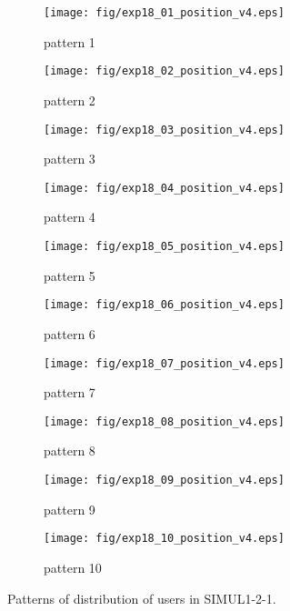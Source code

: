 	\begin{figure}
		\begin{center}
			\begin{subfigure}[b]{0.32\textwidth}
				\texttt{[image: fig/exp18\_01\_position\_v4.eps]}
				\caption{pattern 1}
				\label{figure:simul1_2_1_a}
			\end{subfigure}
			\begin{subfigure}[b]{0.32\textwidth}
				\texttt{[image: fig/exp18\_02\_position\_v4.eps]}
				\caption{pattern 2}
				\label{figure:simul1_2_1_b}
			\end{subfigure}
			\begin{subfigure}[b]{0.32\textwidth}
				\texttt{[image: fig/exp18\_03\_position\_v4.eps]}
				\caption{pattern 3}
				\label{figure:simul1_2_1_c}
			\end{subfigure}
			\begin{subfigure}[b]{0.32\textwidth}
				\texttt{[image: fig/exp18\_04\_position\_v4.eps]}
				\caption{pattern 4}
				\label{figure:simul1_2_1_d}
			\end{subfigure}
			\begin{subfigure}[b]{0.32\textwidth}
				\texttt{[image: fig/exp18\_05\_position\_v4.eps]}
				\caption{pattern 5}
				\label{figure:simul1_2_1_e}
			\end{subfigure}
			\begin{subfigure}[b]{0.32\textwidth}
				\texttt{[image: fig/exp18\_06\_position\_v4.eps]}
				\caption{pattern 6}
				\label{figure:simul1_2_1_f}
			\end{subfigure}
			\begin{subfigure}[b]{0.32\textwidth}
				\texttt{[image: fig/exp18\_07\_position\_v4.eps]}
				\caption{pattern 7}
				\label{figure:simul1_2_1_g}
			\end{subfigure}
			\begin{subfigure}[b]{0.32\textwidth}
				\texttt{[image: fig/exp18\_08\_position\_v4.eps]}
				\caption{pattern 8}
				\label{figure:simul1_2_1_h}
			\end{subfigure}
			\begin{subfigure}[b]{0.32\textwidth}
				\texttt{[image: fig/exp18\_09\_position\_v4.eps]}
				\caption{pattern 9}
				\label{figure:simul1_2_1_i}
			\end{subfigure}
			\begin{subfigure}[b]{0.32\textwidth}
				\texttt{[image: fig/exp18\_10\_position\_v4.eps]}
				\caption{pattern 10}
				\label{figure:simul1_2_1_j}
			\end{subfigure}
			\caption{Patterns of distribution of users in SIMUL1-2-1.}
			\label{figure:simul1_2_1_p}
		\end{center}
	\end{figure}

